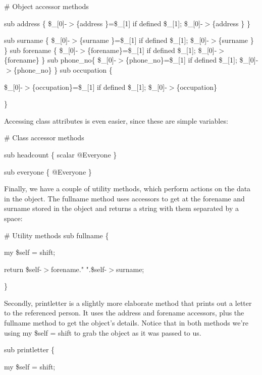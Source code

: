 \documentclass[a4paper,11pt]{book}
\begin{document}
\noindent 

\noindent \# Object accessor methods

\noindent sub address  \{ \$\_[0]-$>$\{address \}=\$\_[1] if defined \$\_[1]; \$\_[0]-$>$\{address \} \}

\noindent sub surname  \{ \$\_[0]-$>$\{surname \}=\$\_[1] if defined \$\_[1]; \$\_[0]-$>$\{surname \} \} sub forename \{ \$\_[0]-$>$\{forename\}=\$\_[1] if defined \$\_[1]; \$\_[0]-$>$\{forename\} \} sub phone\_no\{ \$\_[0]-$>$\{phone\_no\}=\$\_[1] if defined \$\_[1]; \$\_[0]-$>$\{phone\_no\} \} sub occupation  \{

\noindent \$\_[0]-$>$\{occupation\}=\$\_[1] if defined \$\_[1]; \$\_[0]-$>$\{occupation\}

\noindent \}

\noindent 

\noindent Accessing class attributes is even easier, since these are simple variables:

\noindent 

\noindent \# Class accessor methods

\noindent sub headcount \{ scalar @Everyone \}

\noindent sub everyone  \{ @Everyone \}

\noindent 

\noindent Finally, we have a couple of utility methods, which perform actions on the data in the object. The fullname method uses accessors to get at the forename and surname stored in the object and returns a string with them separated by a space:

\noindent 

\noindent \# Utility methods sub fullname \{

\noindent my \$self = shift;

\noindent return \$self-$>$forename." ".\$self-$>$surname;

\noindent \}

\noindent 

\noindent Secondly, printletter is a slightly more elaborate method that prints out a letter to the referenced person. It uses the address and forename accessors, plus the fullname method to get the object's details. Notice that in both methods we're using my \$self = shift to grab the object as it was passed to us.

\noindent 

\noindent sub printletter \{

\noindent my \$self = shift;
\end{document}
